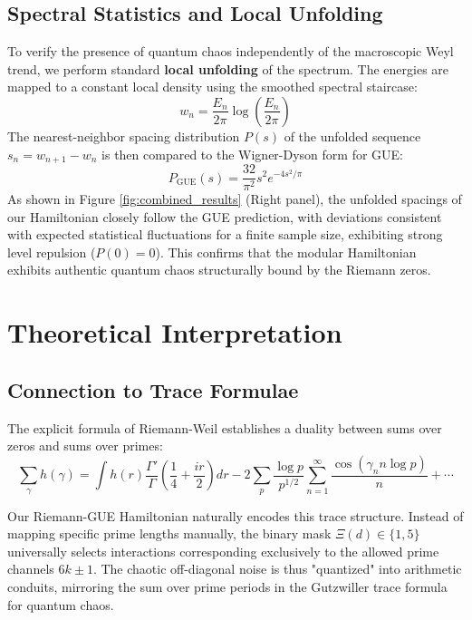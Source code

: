 \documentclass[prl,aps,floatfix,superscriptaddress,10pt]{revtex4-2}
\begin{document}
\subsection{Spectral Statistics and Local Unfolding}

To verify the presence of quantum chaos independently of the macroscopic Weyl trend, we perform standard \textbf{local unfolding} of the spectrum.
The energies are mapped to a constant local density using the smoothed spectral staircase:
\begin{equation}
w_n = \frac{E_n}{2\pi} \log\left(\frac{E_n}{2\pi}\right)
\end{equation}
The nearest-neighbor spacing distribution $P(s)$ of the unfolded sequence $s_n = w_{n+1} - w_n$ is then compared to the Wigner-Dyson form for GUE:
\begin{equation}
P_{\text{GUE}}(s) = \frac{32}{\pi^2} s^2 e^{-4s^2/\pi}
\end{equation}
As shown in Figure \ref{fig:combined_results} (Right panel), the unfolded spacings of our Hamiltonian closely follow the GUE prediction, with deviations consistent with expected statistical fluctuations for a finite sample size, exhibiting strong level repulsion ($P(0)=0$).
This confirms that the modular Hamiltonian exhibits authentic quantum chaos structurally bound by the Riemann zeros.

\section{Theoretical Interpretation}

\subsection{Connection to Trace Formulae}

The explicit formula of Riemann-Weil establishes a duality between sums over zeros and sums over primes:
\begin{equation}
\sum_{\gamma} h(\gamma) = \int h(r) \frac{\Gamma'}{\Gamma}\left(\frac14 + \frac{ir}{2}\right) dr - 2\sum_{p} \frac{\log p}{p^{1/2}} \sum_{n=1}^\infty \frac{\cos(\gamma_n n\log p)}{n} + \cdots
\end{equation}

Our Riemann-GUE Hamiltonian naturally encodes this trace structure.
Instead of mapping specific prime lengths manually, the binary mask $\Xi(d) \in \{1,5\}$ universally selects interactions corresponding exclusively to the allowed prime channels $6k\pm1$.
The chaotic off-diagonal noise is thus "quantized" into arithmetic conduits, mirroring the sum over prime periods in the Gutzwiller trace formula for quantum chaos.
\end{document}
